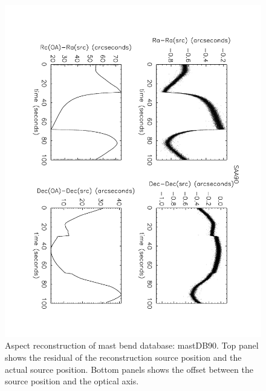 \begin{figure}[htbp] %
   \centering
   \includegraphics[width=14cm, angle=180]{images/test3.pdf} 
   \caption{\footnotesize{Aspect reconstruction of mast bend database: mastDB90. Top panel shows the residual of the reconstruction source position and the actual source position. Bottom panels shows the offset between the source position and the optical axis.}}
   \label{test3}
\end{figure}
